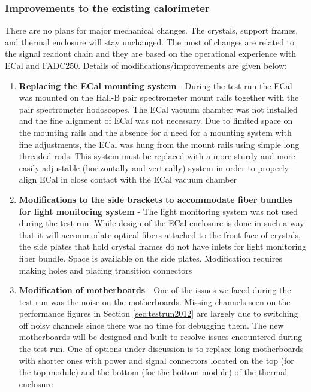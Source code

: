 \subsubsection{Improvements to the existing calorimeter}

There are no plans for major mechanical changes. The crystals, support frames, and thermal enclosure will stay unchanged. The most of changes are related to the signal readout chain and they are based on the operational experience with ECal and FADC250. Details of modifications/improvements are given below: 

\begin{enumerate}
\item {\bf Replacing the ECal mounting system} - 
During the test run the ECal was mounted on the Hall-B pair spectrometer mount rails together with the pair spectrometer hodoscopes. The ECal vacuum chamber was not installed and the fine alignment of ECal was not necessary. Due to limited space on the mounting rails and the absence for a need for a mounting system with fine adjustments, the ECal was hung from the mount rails using simple long threaded rods. This system must be replaced with a more sturdy and more easily  adjustable (horizontally and vertically) system in order to properly align ECal in close contact with the ECal vacuum chamber

\item {\bf Modifications to the side brackets to accommodate fiber bundles for light monitoring system} -
The light monitoring system was not used during the test run. While design of the ECal enclosure is done in such a way that it will accommodate optical fibers attached to the front face of crystals, the side plates that hold crystal frames do not have inlets for light monitoring fiber bundle. Space is available on the side plates. Modification requires making holes and placing transition connectors  
    
\item {\bf Modification of motherboards} - One of the issues we faced during the test run was the noise on the motherboards. Missing channels seen on the performance figures in Section \ref{sec:testrun2012} are largely due to switching off noisy channels since there was no time for debugging them. The new motherboards will be designed and built to resolve issues encountered during the test run. One of options under discussion is to replace long motherboards with shorter ones with power and signal connectors located on the top (for the top module) and the bottom (for the bottom module) of the thermal enclosure


\end{enumerate}
